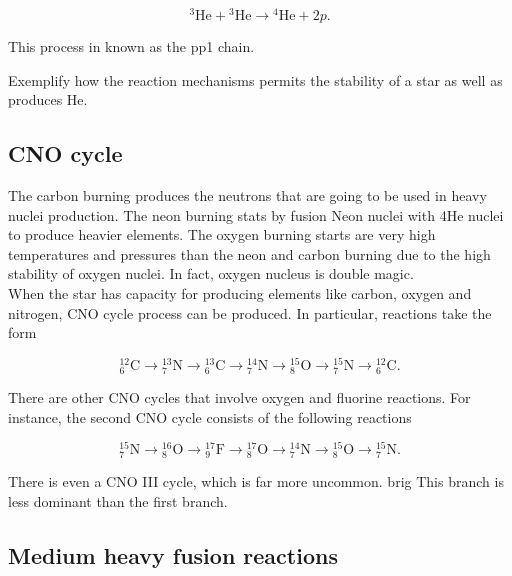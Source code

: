 \documentclass[openany]{book}
\begin{document}
\begin{equation} \label{eq:reaction_3Hep3He}
	{}^{3}\mathrm{He} +  {}^{3}\mathrm{He}  \rightarrow {}^{4}\mathrm{He} + 2p.
\end{equation}

This process in known as the pp1 chain.

Exemplify how the reaction mechanisms permits the stability of a star as well as produces He. \\

\subsection{CNO cycle}  \label{sub:CNOCycle}

The carbon burning produces the neutrons that are going to be used in heavy nuclei production. 
The neon burning stats by fusion Neon nuclei with 4He nuclei to produce heavier elements.
The oxygen burning starts are very high temperatures and pressures than the neon and carbon burning due to the high stability of oxygen nuclei. In fact, oxygen nucleus is double magic. \\

When the star has capacity for producing elements like carbon, oxygen and nitrogen,  CNO cycle process can be produced. In particular, reactions take the form 

\begin{equation} \label{eq:reaction_CNO_C}
	\mathrm{{}_{6}^{12}C  \rightarrow {}^{13}_{7}N  \rightarrow {}^{13}_{6}C  \rightarrow {}^{14}_{7}N  \rightarrow {}^{15}_{8}O  \rightarrow {}^{15}_{7}N \rightarrow {}^{12}_{6}C  }.
\end{equation}



There are other CNO cycles that involve oxygen and fluorine reactions. For instance, the second CNO cycle consists of the following reactions

\begin{equation} \label{eq:reaction_CNO_N}
	\mathrm{{}_{7}^{15}N  \rightarrow {}^{16}_{8}O  \rightarrow {}^{17}_{9}F  \rightarrow {}^{17}_{8}O  \rightarrow {}^{14}_{7}N  \rightarrow {}^{15}_{8}O \rightarrow {}^{15}_{7}N  }.
\end{equation}

There is even a CNO III cycle, which is far more uncommon. 
brig
This branch is less dominant than the first branch.

\subsection{Medium heavy fusion reactions} \label{sub:mediumHeavyReactions}
\end{document}
